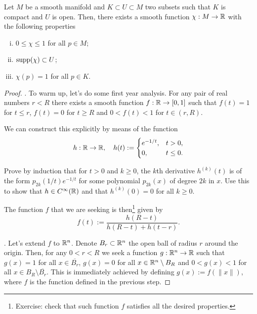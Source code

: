 \begin{lemma}
  Let $M$ be a smooth manifold and $K\subset U\subset M$ two subsets such that $K$ is compact and $U$ is open.
  Then, there exists a smooth function $\chi: M \to\mathbb{R}$ with the following properties
  \begin{enumerate}[(i)]
    \item $0 \leq \chi \leq 1$ for all $p\in M$;
    \item $\operatorname{supp}(\chi)\subset U$;
    \item $\chi(p) = 1$ for all $p\in K$.
  \end{enumerate}
\end{lemma}
\begin{proof}
  .
  To warm up, let's do some first year analysis.
  For any pair of real numbers $r < R$ there exists a smooth function $f: \mathbb{R} \to [0,1]$ such that $f(t) = 1$ for $t \leq r$, $f(t) = 0$ for $t \geq R$ and $0<f(t)<1$ for $t\in(r,R)$.

  We can construct this explicitly by means of the function
  \begin{equation}
    h:\mathbb{R}\to\mathbb{R}, \quad h(t):= \begin{cases}
      e^{-1/t}, & t>0,      \\
      0,        & t \leq 0.
    \end{cases}
  \end{equation}

  \begin{exercise}
    Prove by induction that for $t>0$ and $k\geq 0$, the $k$th derivative $h^{(k)}(t)$ is of the form $p_{2k}(1/t)e^{-1/t}$ for some polynomial $p_{2k}(x)$ of degree $2k$ in $x$.
    Use this to show that $h\in C^\infty(\mathbb{R})$ and that $h^{(k)}(0) = 0$ for all $k\geq 0$.
  \end{exercise}

  The function $f$ that we are seeking is then\footnote{Exercise: check that such function $f$ satisfies all the desired properties.} given by
  \begin{equation}
    f(t) := \frac{h(R-t)}{h(R-t) + h(t-r)}.
  \end{equation}

  .
  Let's extend $f$ to $\mathbb{R}^n$.
  Denote $B_r \subset \mathbb{R}^n$ the open ball of radius $r$ around the origin.
  Then, for any $0 < r < R$ we seek a function $g:\mathbb{R}^n\to\mathbb{R}$ such that $g(x) = 1$ for all $x\in \overline{B_r}$, $g(x) = 0$ for all $x\in \mathbb{R}^n\setminus B_R$ and $0< g(x)< 1$ for all $x\in B_R\setminus\overline{B_r}$.
  This is immediately achieved by defining $g(x) := f(\|x\|)$, where $f$ is the function defined in the previous step.


\end{proof}
